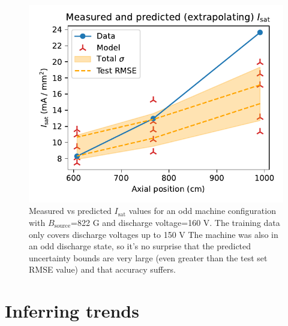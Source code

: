 \begin{figure}
	\centering
	\includegraphics[width=\textwidth]{figures/measured-vs-predicted_160V.pdf}
	\caption[size=12]{\label{fig:measured-vs-predicted_160V}Measured vs predicted $I_\text{sat}$ values for an odd machine configuration with $B_\text{source}$=822 G and discharge voltage=160 V. The training data only covers discharge voltages up to 150 V The machine was also in an odd discharge state, so it's no surprise that the predicted uncertainty bounds are very large (even greater than the test set RMSE value) and that accuracy suffers.}
\end{figure}

\section{Inferring trends}
\label{sec:trends}



